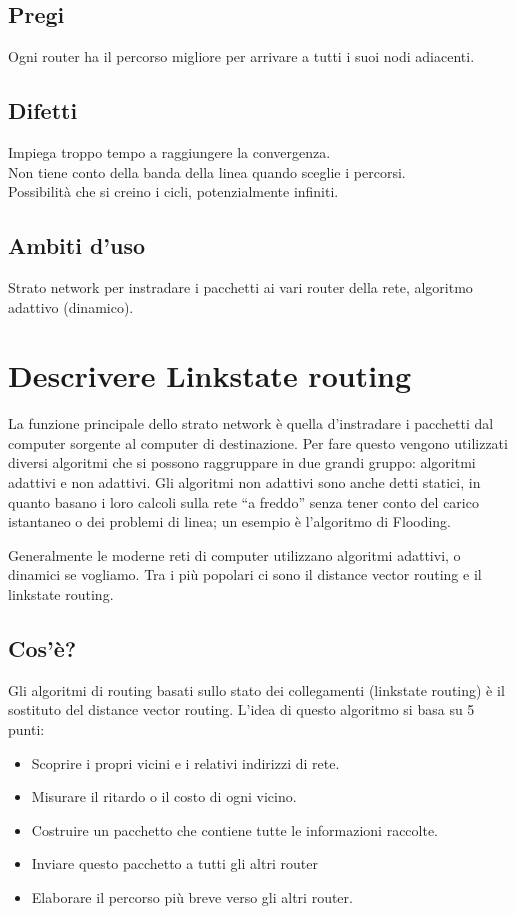 \subsection{Pregi}
Ogni router ha il percorso migliore per arrivare a tutti i suoi nodi adiacenti.

\subsection{Difetti}
Impiega troppo tempo a raggiungere la convergenza.\\
Non tiene conto della banda della linea quando sceglie i percorsi.\\
Possibilità che si creino i cicli, potenzialmente infiniti.

\subsection{Ambiti d'uso}
Strato network per instradare i pacchetti ai vari router della rete, algoritmo adattivo (dinamico).

\section{Descrivere Linkstate routing}

La funzione principale dello strato network è quella d’instradare i pacchetti dal computer sorgente al computer di destinazione. Per fare questo vengono utilizzati diversi algoritmi che si possono raggruppare in due grandi gruppo: algoritmi adattivi e non adattivi. Gli algoritmi non adattivi sono anche detti statici, in quanto basano i loro calcoli sulla rete “a freddo” senza tener conto del carico istantaneo o dei problemi di linea; un esempio è l’algoritmo di Flooding.

Generalmente le moderne reti di computer utilizzano algoritmi adattivi, o dinamici se vogliamo. Tra i più popolari ci sono il distance vector routing e il linkstate routing.
\subsection{Cos'è?}
Gli algoritmi di routing basati sullo stato dei collegamenti (linkstate routing) è il sostituto del distance vector routing. L’idea di questo algoritmo si basa su 5 punti:
\begin{itemize}
\item	Scoprire i propri vicini e i relativi indirizzi di rete.
\item	Misurare il ritardo o il costo di ogni vicino.
\item	Costruire un pacchetto che contiene tutte le informazioni raccolte.
\item	Inviare questo pacchetto a tutti gli altri router
\item	Elaborare il percorso più breve verso gli altri router.
\end{itemize}

